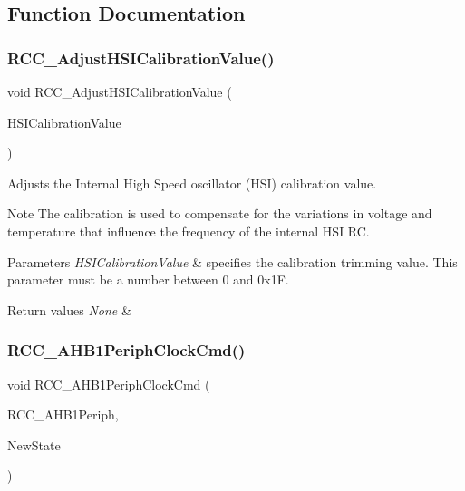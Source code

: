 \subsection{Function Documentation}
\mbox{\label{group___r_c_c_gaa2d6a35f5c2e0f86317c3beb222677fc}} 
\subsubsection{\texorpdfstring{R\+C\+C\+\_\+\+Adjust\+H\+S\+I\+Calibration\+Value()}{RCC\_AdjustHSICalibrationValue()}}
{\footnotesize\ttfamily void R\+C\+C\+\_\+\+Adjust\+H\+S\+I\+Calibration\+Value (\begin{DoxyParamCaption}\item[{uint8\+\_\+t}]{H\+S\+I\+Calibration\+Value }\end{DoxyParamCaption})}



Adjusts the Internal High Speed oscillator (H\+SI) calibration value. 

\begin{DoxyNote}{Note}
The calibration is used to compensate for the variations in voltage and temperature that influence the frequency of the internal H\+SI RC. 
\end{DoxyNote}

\begin{DoxyParams}{Parameters}
{\em H\+S\+I\+Calibration\+Value} & specifies the calibration trimming value. This parameter must be a number between 0 and 0x1F. \\
\hline
\end{DoxyParams}

\begin{DoxyRetVals}{Return values}
{\em None} & \\
\hline
\end{DoxyRetVals}
\mbox{\label{group___r_c_c_ga80c89116820d48bb38db2e7d5e5a49b9}} 
\subsubsection{\texorpdfstring{R\+C\+C\+\_\+\+A\+H\+B1\+Periph\+Clock\+Cmd()}{RCC\_AHB1PeriphClockCmd()}}
{\footnotesize\ttfamily void R\+C\+C\+\_\+\+A\+H\+B1\+Periph\+Clock\+Cmd (\begin{DoxyParamCaption}\item[{uint32\+\_\+t}]{R\+C\+C\+\_\+\+A\+H\+B1\+Periph,  }\item[{Functional\+State}]{New\+State }\end{DoxyParamCaption})}



